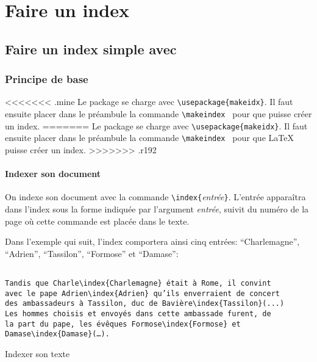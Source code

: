 
\chapter{Faire un index}


\section{Faire un index simple avec }


\subsection{Principe de base}
\begin{prealable}
<<<<<<< .mine
Le package se charge avec \verb|\usepackage{makeidx}|. Il faut ensuite placer dans le préambule la commande \verb|\makeindex | pour que \LaTex  puisse créer un index.
=======
Le package se charge avec \verb|\usepackage{makeidx}|. Il faut ensuite placer dans le préambule la commande \verb|\makeindex | pour que \LaTeX{}  puisse créer un index.
>>>>>>> .r192
\end{prealable}



\subsubsection{Indexer son document}


On indexe son document avec  la commande \verb+\index{+\emph{entrée}\verb+}+. L'entrée apparaîtra dans l'index sous la forme indiquée par l'argument \emph{entrée}, suivit du numéro de la page où cette commande est placée dans le texte. 

Dans l'exemple qui suit, l'index comportera ainsi cinq entrées: \enquote{Charlemagne}, \enquote{Adrien}, \enquote{Tassilon}, \enquote{Formose} et \enquote{Damase}:
\begin{listing}[ht]
\begin{verbatim}

Tandis que Charle\index{Charlemagne} était à Rome, il convint
avec le pape Adrien\index{Adrien} qu’ils enverraient de concert
des ambassadeurs à Tassilon, duc de Bavière\index{Tassilon}(...)
Les hommes choisis et envoyés dans cette ambassade furent, de 
la part du pape, les évêques Formose\index{Formose} et 
Damase\index{Damase}(…).

\end{verbatim}
\caption{Indexer son texte}
\end{listing}


